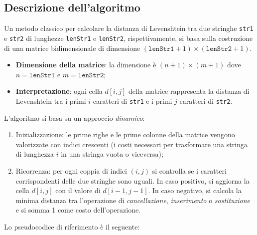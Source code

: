 \documentclass[14pt]{extbook}
\begin{document}
\subsection{Descrizione dell'algoritmo}
Un metodo classico per calcolare la distanza di Levenshtein tra due stringhe 
\texttt{str1} e \texttt{str2} di lunghezze \texttt{lenStr1} e \texttt{lenStr2}, 
rispettivamente, si basa sulla costruzione di una matrice bidimensionale 
di dimensione $(\texttt{lenStr1} + 1) \times (\texttt{lenStr2} + 1)$.

\begin{itemize}
  \item \textbf{Dimensione della matrice}: la dimensione è $(n + 1) \times (m + 1)$ 
        dove $n = \texttt{lenStr1}$ e $m = \texttt{lenStr2}$;
  \item \textbf{Interpretazione}: ogni cella $d[i,j]$ della matrice rappresenta 
        la distanza di Levenshtein tra i primi $i$ caratteri di \texttt{str1} 
        e i primi $j$ caratteri di \texttt{str2}.
\end{itemize}

L'algoritmo si basa su un approccio \emph{dinamico}:

\begin{enumerate}
  \item Inizializzazione: le prime righe e le prime colonne della matrice 
        vengono valorizzate con indici crescenti (i costi necessari per 
        trasformare una stringa di lunghezza $i$ in una stringa vuota o viceversa);
  \item Ricorrenza: per ogni coppia di indici $(i,j)$ si controlla se i caratteri 
        corrispondenti delle due stringhe sono uguali. In caso positivo, si 
        aggiorna la cella $d[i,j]$ con il valore di $d[i-1,j-1]$. In caso negativo, 
        si calcola la minima distanza tra l’operazione di \textit{cancellazione}, 
        \textit{inserimento} o \textit{sostituzione} e si somma 1 come costo 
        dell’operazione.
\end{enumerate}

Lo pseudocodice di riferimento è il seguente:
\end{document}
